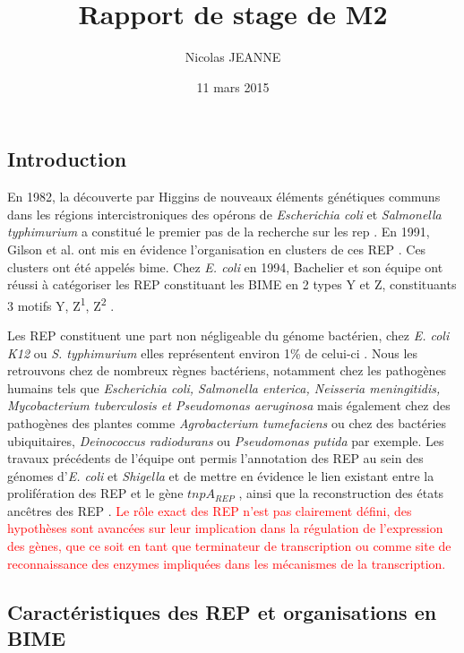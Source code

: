 \documentclass[12pt,a4paper]{report}
\author{Nicolas JEANNE}
\title{Rapport de stage de M2}
\date{11 mars 2015}
\begin{document}
\maketitle

\begin{onehalfspace}
\chapter*{Introduction}
En 1982, la découverte par Higgins de nouveaux éléments génétiques communs dans les régions intercistroniques des opérons de \textit{Escherichia coli} et \textit{Salmonella typhimurium} a constitué le premier pas de la recherche sur les \gls{rep} \citep{Higgins1982}. En 1991, Gilson et al. ont mis en évidence l'organisation en clusters de ces REP \citep{Gilson1991}. Ces clusters ont été appelés \gls{bime}. Chez \textit{E. coli} en 1994, Bachelier et son équipe ont réussi à catégoriser les REP constituant les BIME en 2 types Y et Z, constituants 3 motifs Y, Z\textsuperscript{1}, Z\textsuperscript{2}  \citep{Bachellier1994}.
 
Les REP constituent une part non négligeable du génome bactérien, chez \textit{E. coli K12} ou \textit{S. typhimurium} elles représentent environ 1\% de celui-ci \citep{Gilson1991}. Nous les retrouvons chez de nombreux règnes bactériens, notamment chez les pathogènes humains tels que \textit{Escherichia coli, Salmonella enterica, Neisseria meningitidis, Mycobacterium tuberculosis et Pseudomonas aeruginosa} mais également chez des pathogènes des plantes comme \textit{Agrobacterium tumefaciens} ou chez des bactéries ubiquitaires, \textit{Deinococcus radiodurans} ou \textit{Pseudomonas putida} par exemple. Les travaux précédents de l'équipe ont permis l'annotation des REP au sein des génomes d'\textit{E. coli} et \textit{Shigella} et de mettre en évidence le lien existant entre la prolifération des REP et le gène $tnpA_{REP}$ \citep{Weyder2013,Bosc2014}, ainsi que la reconstruction des états ancêtres des REP \citep{Bosc2014}.  \textcolor{red}{Le rôle exact des REP n'est pas clairement défini, des hypothèses sont avancées sur leur implication dans la régulation de l'expression des gènes, que ce soit en tant que terminateur de transcription ou comme site de reconnaissance des enzymes impliquées dans les mécanismes de la transcription.}

\section*{Caractéristiques des REP et organisations en BIME}


\end{onehalfspace}
\end{document}
